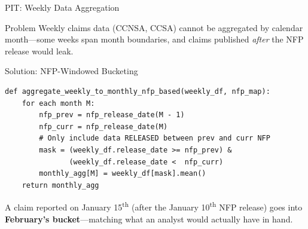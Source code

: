 \documentclass[aspectratio=169,10pt]{beamer}
\begin{document}
\begin{frame}[fragile]{PIT: Weekly Data Aggregation}
\begin{block}{Problem}
Weekly claims data (CCNSA, CCSA) cannot be aggregated by calendar month---some weeks span month boundaries, and claims published \emph{after} the NFP release would leak.
\end{block}

\vspace{0.2cm}
\begin{block}{Solution: NFP-Windowed Bucketing}
\begin{lstlisting}[style=pseudo]
def aggregate_weekly_to_monthly_nfp_based(weekly_df, nfp_map):
    for each month M:
        nfp_prev = nfp_release_date(M - 1)
        nfp_curr = nfp_release_date(M)
        # Only include data RELEASED between prev and curr NFP
        mask = (weekly_df.release_date >= nfp_prev) &
               (weekly_df.release_date <  nfp_curr)
        monthly_agg[M] = weekly_df[mask].mean()
    return monthly_agg
\end{lstlisting}
\end{block}

\vspace{0.1cm}
\footnotesize
A claim reported on January 15\textsuperscript{th} (after the January 10\textsuperscript{th} NFP release) goes into \textbf{February's bucket}---matching what an analyst would actually have in hand.
\end{frame}
\end{document}
